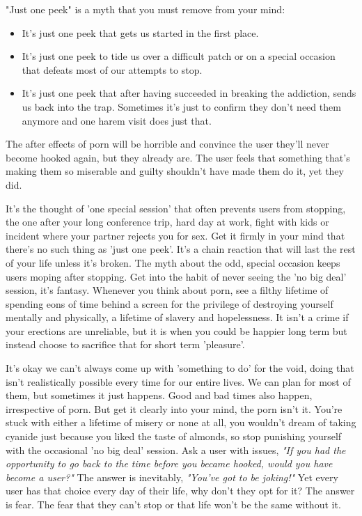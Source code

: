 \documentclass[easypeasy.tex]{subfiles}
\begin{document}
"Just one peek" is a myth that you must remove from your mind:
\begin{itemize}
  \item It's just one peek that gets us started in the first place.
  \item It's just one peek to tide us over a difficult patch or on a special occasion that defeats most of our attempts to stop.
  \item It's just one peek that after having succeeded in breaking the addiction, sends us back into the trap. Sometimes it's just to confirm they don't need them anymore and one harem visit does just that.
\end{itemize}
The after effects of porn will be horrible and convince the user they'll never become hooked again, but they already are. The user feels that something that's making them so miserable and guilty shouldn't have made them do it, yet they did.

It's the thought of 'one special session' that often prevents users from stopping, the one after your long conference trip, hard day at work, fight with kids or incident where your partner rejects you for sex. Get it firmly in your mind that there's no such thing as 'just one peek'. It's a chain reaction that will last the rest of your life unless it's broken. The myth about the odd, special occasion keeps users moping after stopping. Get into the habit of never seeing the 'no big deal' session, it's fantasy. Whenever you think about porn, see a filthy lifetime of spending eons of time behind a screen for the privilege of destroying yourself mentally and physically, a lifetime of slavery and hopelessness. It isn't a crime if your erections are unreliable, but it is when you could be happier long term but instead choose to sacrifice that for short term 'pleasure'.

It's okay we can't always come up with 'something to do' for the void, doing that isn't realistically possible every time for our entire lives. We can plan for most of them, but sometimes it just happens. Good and bad times also happen, irrespective of porn. But get it clearly into your mind, the porn isn't it. You're stuck with either a lifetime of misery or none at all, you wouldn't dream of taking cyanide just because you liked the taste of almonds, so stop punishing yourself with the occasional 'no big deal' session. Ask a user with issues, \textit{"If you had the opportunity to go back to the time before you became hooked, would you have become a user?"} The answer is inevitably, \textit{"You've got to be joking!"} Yet every user has that choice every day of their life, why don't they opt for it? The answer is fear. The fear that they can't stop or that life won't be the same without it.
\end{document}
